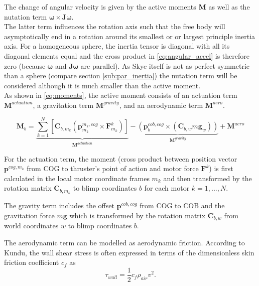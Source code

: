 The change of angular velocity is given by the active moments $\mathbf{M}$ as well as the nutation term $\boldsymbol{\omega} \times \mathbf{J} \boldsymbol{\omega}$.
\\
The latter term influences the rotation axis such that the free body will asymptotically end in a rotation around its smallest or or largest principle inertia axis.
For a homogeneous sphere, the inertia tensor is diagonal with all its diagonal elements equal and the cross product in \eqref{eq:angular_accel} is therefore zero (because $\boldsymbol{\omega}$ and $\mathbf{J}\boldsymbol{\omega}$ are parallel).
As Skye itself is not as perfect symmetric than a sphere (compare section \ref{sub:par_inertia}) the nutation term will be considered although it is much smaller than the active moment.
\\
As shown in \eqref{eq:moments}, the active moment consists of an actuation term $\mathbf{M}^{actuation}$, a gravitation term $\mathbf{M}^{gravity}$, and an aerodynamic term $\mathbf{M}^{aero}$.

\begin{equation}
\label{eq:moments}
\mathbf{M}_b = \underbrace{\sum_{k=1}^N  \left[  \mathbf{C}_{b,m_k} \left( \mathbf{p}^{m_k,cog}_{m_k} \times \mathbf{F}^k_{m_k} \right)  \right]}_{\mathbf{M}^{actuation}}
-
\underbrace{
 \left( \mathbf{p}^{cob,cog}_b \times (\mathbf{C}_{b,w}m\mathbf{g}_w) \right)
}_{\mathbf{M}^{gravity}}
+
\mathbf{M}^{aero}
\end{equation}

For the actuation term, the moment
(cross product between position vector $\mathbf{p}^{cog,m_k}$ from COG to thruster's point of action and motor force $\mathbf{F}^k$)
is first calculated in the local motor coordinate frames $m_k$ and then transformed by the rotation matrix $\mathbf{C}_{b,m_k}$ to blimp coordinates $b$ for each motor $k=1,...,N$.

The gravity term includes the offset $\mathbf{p}^{cob,cog}$ from COG to COB and 
the gravitation force $m\mathbf{g}$ which is transformed by the rotation matrix $\mathbf{C}_{b,w}$ from world coordinates $w$ to blimp coordinates $b$.

The aerodynamic term can be modelled as aerodynamic friction. According to Kundu, the wall shear stress is often expressed in terms of the dimensionless skin friction coefficient $c_f$ as \citet{Kundu2012}
\begin{equation*}
\tau_{wall} = 
\frac{1}{2} c_f \rho_{air} v^2 .
\end{equation*}

